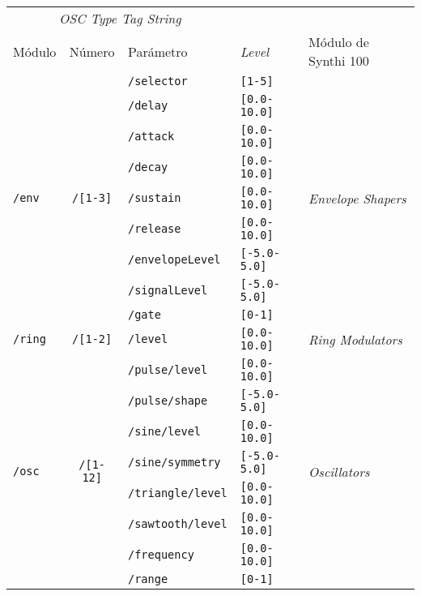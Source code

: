 \begin{table}
	\begin{center}
		\begin{tabular}{ l c l l l }
			\multicolumn{3}{c}{\textit{OSC Type Tag String}} \\
			\cline{1-3}
			Módulo			& Número			& Parámetro				& \textit{Level} 	& Módulo de Synthi 100 \\
			
			\hline 
			\multirow{9}{*}{\texttt{/env}}	& \multirow{9}{*}{\texttt{/[1-3]}}
			& \texttt{/selector}	&\texttt{[1-5]} & \multirow{9}{*}{\textit{Envelope Shapers}}\\
			& & \texttt{/delay} & \texttt{[0.0-10.0]} & \\
			& & \texttt{/attack} & \texttt{[0.0-10.0]} & \\
			& & \texttt{/decay} & \texttt{[0.0-10.0]} &\\
			& & \texttt{/sustain} & \texttt{[0.0-10.0]}  &\\
			& & \texttt{/release} & \texttt{[0.0-10.0]} &\\
			& & \texttt{/envelopeLevel} & \texttt{[-5.0-5.0]} &\\
			& & \texttt{/signalLevel} & \texttt{[-5.0-5.0]} &\\
			& & \texttt{/gate} & \texttt{[0-1]} &\\
			\hline
			
			\multirow{1}{*}{\texttt{/ring}}	& \multirow{1}{*}{\texttt{/[1-2]}}	& \texttt{/level}	&\texttt{[0.0-10.0]} & \multirow{1}{*}{\textit{Ring Modulators}}\\
			\hline
			
			\hline 
			\multirow{8}{*}{\texttt{/osc}}	& \multirow{8}{*}{\texttt{/[1-12]}}	& \texttt{/pulse/level}	&\texttt{[0.0-10.0]} & \multirow{8}{*}{\textit{Oscillators}}\\
			& & \texttt{/pulse/shape} & \texttt{[-5.0-5.0]} & \\
			& & \texttt{/sine/level} & \texttt{[0.0-10.0]} & \\
			& & \texttt{/sine/symmetry} & \texttt{[-5.0-5.0]} &\\
			& & \texttt{/triangle/level} & \texttt{[0.0-10.0]}  &\\
			& & \texttt{/sawtooth/level} & \texttt{[0.0-10.0]} &\\
			& & \texttt{/frequency} & \texttt{[0.0-10.0]} &\\
			& & \texttt{/range} & \texttt{[0-1]} &\\
			

\end{tabular}
\end{center}
\end{table}

